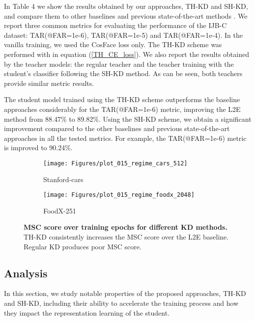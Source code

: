 In Table 4 we show the results obtained by our approaches, TH-KD and SH-KD, and compare them to other baselines and previous state-of-the-art methods \cite{Liu_2021_ICCV}. 
We report three common metrics for evaluating the performance of the IJB-C dataset: TAR(@FAR=1e-6), TAR(@FAR=1e-5) and  TAR(@FAR=1e-4). 
In the vanilla training, we used the CosFace loss only. The TH-KD scheme was performed with  in equation (\ref{TH_CE_loss}). We also report the results obtained by the teacher models: the regular teacher and the teacher training with the student's classifier following the SH-KD method. As can be seen, both teachers provide similar metric results.

The student model trained using the TH-KD scheme outperforms the baseline approaches considerably for the  TAR(@FAR=1e-6) metric, improving the L2E method from 88.47\% to 89.82\%. Using the SH-KD scheme, we obtain a significant improvement compared to the other baselines and previous state-of-the-art approaches in all the tested metrics. For example, the TAR(@FAR=1e-6) metric is improved to 90.24\%.


\begin{figure}[t!]
\centering
\begin{subfigure}[a]{.48\textwidth}
  \centering
  \texttt{[image: Figures/plot\_015\_regime\_cars\_512]}
  \caption{Stanford-cars}
\end{subfigure}\begin{subfigure}[h]{.48\textwidth }
  \centering
  \texttt{[image: Figures/plot\_015\_regime\_foodx\_2048]}
  \caption{FoodX-251}
\end{subfigure}
\caption{\textbf{MSC score over training epochs for different KD methods.} TH-KD consistently increases the MSC score over the L2E baseline. Regular KD produces poor MSC score.}
\label{fig:MSC}
\vspace{-5mm}
\end{figure}


\subsection{Analysis} \label{sec: analysis}
In this section, we study notable properties of the proposed approaches, TH-KD and SH-KD, including their ability to accelerate the training process and how they impact the representation learning of the student.
\vspace{-3mm}



